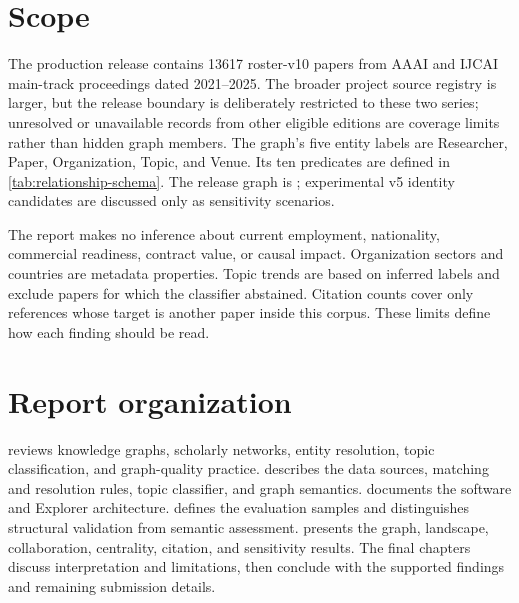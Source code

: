 \section{Scope}

The production release contains \num{13617} roster-v10 papers from AAAI and
IJCAI main-track proceedings dated 2021--2025. The broader project source registry
is larger, but the release boundary is deliberately restricted to these two
series; unresolved or unavailable records from other eligible editions are
coverage limits rather than hidden graph members. The graph's five entity labels
are Researcher, Paper, Organization, Topic, and Venue. Its ten predicates are
defined in \cref{tab:relationship-schema}. The release graph is
\GraphVersion{}; experimental v5 identity candidates are discussed only as
sensitivity scenarios.

The report makes no inference about current employment, nationality, commercial
readiness, contract value, or causal impact. Organization sectors and countries
are metadata properties. Topic trends are based on inferred labels and exclude
papers for which the classifier abstained. Citation counts cover only references
whose target is another paper inside this corpus. These limits define how each
finding should be read.

\section{Report organization}

 reviews knowledge graphs, scholarly networks, entity
resolution, topic classification, and graph-quality practice. 
describes the data sources, matching and resolution rules, topic classifier, and
graph semantics.  documents the software and Explorer
architecture.  defines the evaluation samples and
distinguishes structural validation from semantic assessment. 
presents the graph, landscape, collaboration, centrality, citation, and sensitivity
results. The final chapters discuss interpretation and limitations, then conclude
with the supported findings and remaining submission details.
